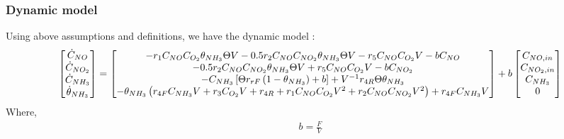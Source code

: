 \subsubsection{Dynamic model}
Using above assumptions and definitions, we have the dynamic model \cite{nova2014urea}:
\begin{equation} \label{eqn::4_state}
    \begin{bmatrix} \dot C_{NO} \\
        \dot C_{NO_2}\\
        \dot C_{NH_3}\\
        \dot \theta_{NH_3}\\
         \end{bmatrix} =
    \begin{bmatrix} 
        -r_1 C_{NO} C_{O_2} \theta_{NH_3} \Theta V
        - 0.5 r_2 C_{NO} C_{NO_2} \theta_{NH_3} \Theta V
        -r_5 C_{NO} C_{O_2} V
        -b C_{NO}\\
        -0.5 r_2 C_{NO} C_{NO_2} \theta_{NH_3} \Theta V
        + r_5 C_{NO} C_{O_2} V
        -b C_{NO_2}\\
        -C_{NH_3} \left[ \Theta r_{rF} \left( 1 - \theta_{NH_3} \right) + b \right] + V^{-1} r_{4R} \Theta \theta_{NH_3}\\
        -\theta_{NH_3} \left( r_{4F}C_{NH_3} V + r_3 C_{O_2}V + r_{4R} + r_1 C_{NO} C_{O_2} V^2 + r_2 C_{NO} C_{NO_2} V^2 \right) + r_{4F} C_{NH_3} V
     \end{bmatrix}
    + b \begin{bmatrix} C_{NO, in} \\ C_{NO_2, in} \\ C_{NH_3} \\ 0 \end{bmatrix}
\end{equation}
Where,
\begin{align*}
    b = \frac{F}{V}
\end{align*}
